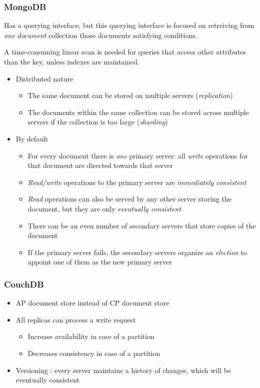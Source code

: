 \subsubsection{MongoDB}

Has a querying interface, but this querying interface is focused on retreiving from \textit{one document} collection those documents satisfying conditions.

A time-consuming linear scan is needed for queries that access other attributes than the key, unless indexes are maintained.

\begin{itemize}
    \item Distributed nature
    \begin{itemize}
        \item The same document can be stored on multiple servers (\textit{replication})
        \item The documents within the same collection can be stored across multiple servers if the collection is too large (\textit{sharding})
    \end{itemize}
    \item By default
    \begin{itemize}
        \item For every document there is \textit{one} primary server: all \textit{write} operations for that document are directed towards that server
        \item \textit{Read/write} operations to the primary server are \textit{immediately consistent}
        \item \textit{Read} operations can also be served by any other server storing the document, but they are only \textit{eventually consistent}
        \item There can be an even number of secondary servers that store copies of the document
        \item If the primary server fails, the secondary servers organize an \textit{election} to appoint one of them as the new primary server
    \end{itemize}
\end{itemize}

\subsubsection{CouchDB}

\begin{itemize}
    \item AP document store instead of CP document store
    \item All replicas can process a write request
    \begin{itemize}
        \item Increase availability in case of a partition
        \item Decreases consistency in case of a partition
    \end{itemize}
    \item Versioning : every server maintains a history of changes, which will be eventually consistent
\end{itemize}

